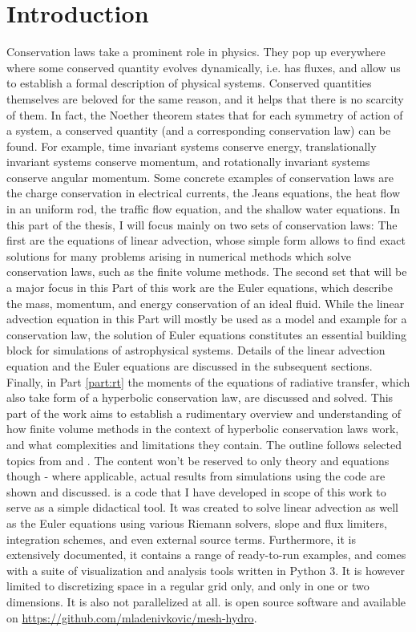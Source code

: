 \chapter{Introduction}

Conservation laws take a prominent role in physics. They pop up everywhere where some conserved
quantity evolves dynamically, i.e. has fluxes, and allow us to establish a formal description of
physical systems. Conserved quantities themselves are beloved for the same reason, and it helps that
there is no scarcity of them. In fact, the Noether theorem
\citep{noetherInvarianteVariationsprobleme1918} states that for each symmetry of action of a system,
a conserved quantity (and a corresponding conservation law) can be found. For example, time
invariant systems conserve energy, translationally invariant systems conserve momentum, and
rotationally invariant systems conserve angular momentum. Some concrete examples of conservation
laws are the charge conservation in electrical currents, the Jeans equations, the heat flow in an
uniform rod, the traffic flow equation, and the shallow water equations. In this part of the
thesis, I will focus mainly on two sets of conservation laws: The first are the equations of linear advection, whose simple form allows to find exact solutions for many problems arising in numerical
methods which solve conservation laws, such as the finite volume methods. The second set that will
be a major focus in this Part of this work are the Euler equations, which describe the mass,
momentum, and energy conservation of an ideal fluid. While the linear advection equation in this
Part will mostly be used as a model and example for a conservation law, the solution of Euler
equations constitutes an essential building block for simulations of astrophysical systems. Details
of the linear advection equation and the Euler equations are discussed in the subsequent sections.
Finally, in Part \ref{part:rt} the moments of the equations of radiative transfer, which also take
form of a hyperbolic conservation law, are discussed and solved. This part of the work aims to
establish a rudimentary overview and understanding of how finite volume methods in the context of
hyperbolic conservation laws work, and what complexities and limitations they contain. The outline
follows selected topics from \citet{toroRiemannSolversNumerical2009} and
\citet{levequeFiniteVolumeMethods2002}. The content won't be reserved to only theory and equations
though - where applicable, actual results from simulations using the \meshhydro code are
shown and discussed. \meshhydro is a code that I have developed in scope of this work to
serve as a simple didactical tool. It was created to solve linear advection as well as the Euler
equations using various Riemann solvers, slope and flux limiters, integration schemes, and even
external source terms. Furthermore, it is extensively documented, it contains a range of
ready-to-run examples, and comes with a suite of visualization and analysis tools written in Python
3. It is however limited to discretizing space in a regular grid only, and only in one or two
dimensions. It is also not parallelized at all. \meshhydro is open source software and
available on \url{https://github.com/mladenivkovic/mesh-hydro}.
